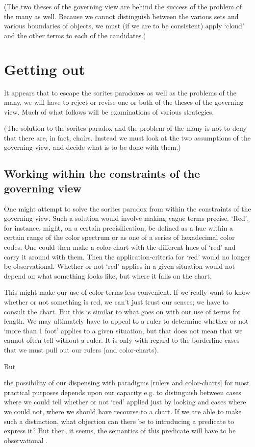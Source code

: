 \documentclass[11pt]{standalone}
\newenvironment{squote}{%
\begin{spacing}{1}
       	\begin{list}{}{%
\setlength{\labelwidth}{0pt}%
\rightmargin\leftmargin%
}
\item\relax
}{%
\end{list}%
\end{spacing}
}
\begin{document}
\begin{spacing}{1.5}
(The two theses of the governing view are behind the success of the
problem of the many as well.  Because we cannot distinguish between
the various sets and various boundaries of objects, we must (if we are
to be consistent) apply `cloud' and the other terms to each of the
candidates.)

\section{Getting out}
It appears that to escape the sorites paradoxes as well as the
problems of the many, we will have to reject or revise one or both of
the theses of the governing view.  Much of what follows will be
examinations of various strategies.

(The solution to the sorites paradox and the problem of the many is
not to deny that there are, in fact, chairs.  Instead we must look at
the two assumptions of the governing view, and decide what is to be
done with them.)

\subsection{Working within the constraints of the governing view}
One might attempt to solve the sorites paradox from within the
constraints of the governing view.  Such a solution would involve
making vague terms precise.  `Red', for instance, might, on a certain
precisification, be defined as a hue within a certain range of the
color spectrum or as one of a series of hexadecimal color codes.  One
could then make a color-chart with the different hues of `red' and
carry it around with them.  Then the application-criteria for `red'
would no longer be observational.  Whether or not `red' applies in a
given situation would not depend on what something looks like, but
where it falls on the chart.

This might make our use of color-terms less convenient.  If we really
want to know whether or not something is red, we can't just trust our
senses; we have to consult the chart.  But this is similar to what
goes on with our use of terms for length.  We may ultimately have to
appeal to a ruler to determine whether or not `more than 1 foot'
applies to a given situation, but that does not mean that we cannot
often tell without a ruler.  It is only with regard to the borderline
cases that we must pull out our rulers (and color-charts).

But

\begin{squote}
the possibility of our dispensing with paradigms [rulers and
  color-charts] for most practical purposes depends upon our capacity
e.g. to distinguish between cases where we could tell whether or not
`red' applied just by looking and cases where we could not, where we
should have recourse to a chart.  If we are able to make such a
distinction, what objection can there be to introducing a predicate to
express it?  But then, it seems, the semantics of this predicate will
have to be observational \citep[359]{wright1975}.
\end{squote}


\end{spacing}
\end{document}
